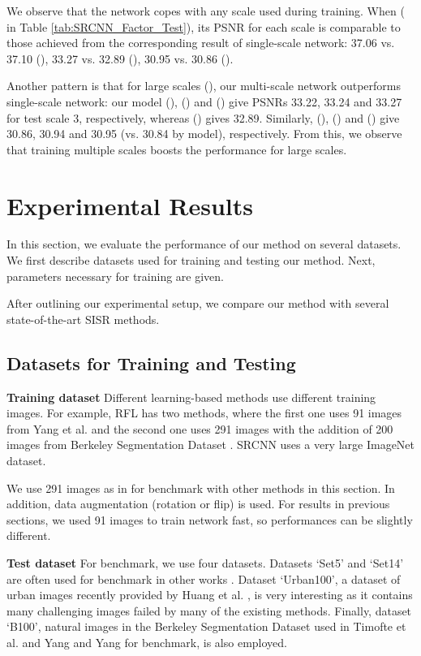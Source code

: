 \documentclass[10pt,twocolumn,letterpaper]{article}
\begin{document}
We observe that the network copes with any scale used during training. When  ( in Table \ref{tab:SRCNN_Factor_Test}), its PSNR for each scale is comparable to those achieved from the corresponding result of single-scale network: 37.06 vs. 37.10 (), 33.27 vs. 32.89 (), 30.95 vs. 30.86 ().

Another pattern is that for large scales (), our multi-scale network outperforms single-scale network: our model (), () and () give PSNRs 33.22, 33.24 and 33.27 for test scale 3, respectively, whereas () gives 32.89. Similarly, (), () and () give 30.86, 30.94 and 30.95 (vs. 30.84 by  model),  respectively. From this, we observe that training multiple scales boosts the performance for large scales.



\section{Experimental Results}
\label{sec:exp}
In this section, we evaluate the performance of our method on several datasets. We first describe datasets used for training and testing our method. Next, parameters necessary for training are given. 

After outlining our experimental setup, we compare our method with several state-of-the-art SISR methods. 

\subsection{Datasets for Training and Testing}
\textbf{Training dataset} Different learning-based methods use different training images. For example, RFL \cite{schulter2015fast} has two methods, where the first one uses 91 images from Yang et al. \cite{yang2010image} and the second one uses 291 images with the addition of 200 images from Berkeley Segmentation Dataset \cite{Martin2001}. SRCNN \cite{dong2015image} uses a very large ImageNet dataset. 

We use 291 images as in \cite{schulter2015fast} for benchmark with other methods in this section. In addition, data augmentation (rotation or flip) is used. For results in previous sections, we used 91 images to train network fast, so performances can be slightly different. 

\textbf{Test dataset} For benchmark, we use four datasets. Datasets `Set5' \cite{bevilacqua2012} and `Set14' \cite{zeyde2012single} are often used for benchmark in other works \cite{Timofte,Timofte2013,Dong2014}. Dataset `Urban100', a dataset of urban images recently provided by Huang et al. \cite{Huang-CVPR-2015}, is very interesting as it contains many challenging images failed by many of the existing methods. Finally, dataset `B100', natural images in the Berkeley Segmentation Dataset used in Timofte et al. \cite{Timofte} and Yang and Yang \cite{Yang2013} for benchmark, is also employed. 
\end{document}
